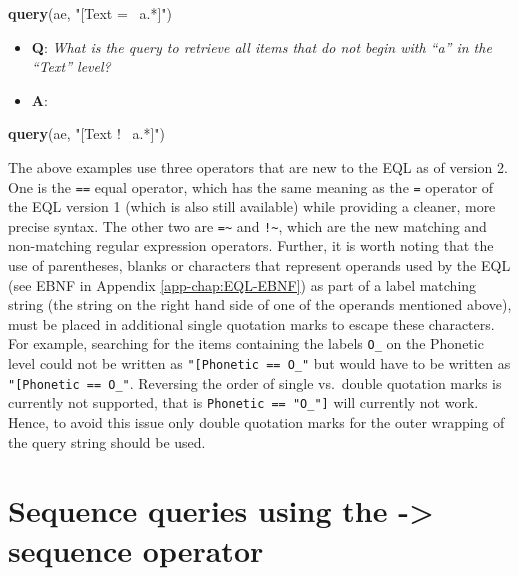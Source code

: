 \documentclass[]{book}
\newenvironment{Shaded}{\begin{snugshade}}{\end{snugshade}}
\newcommand{\KeywordTok}[1]{\textcolor[rgb]{0.13,0.29,0.53}{\textbf{#1}}}
\newcommand{\NormalTok}[1]{#1}
\newcommand{\StringTok}[1]{\textcolor[rgb]{0.31,0.60,0.02}{#1}}
\providecommand{\tightlist}{%
  \setlength{\itemsep}{0pt}\setlength{\parskip}{0pt}}
\begin{document}
\begin{Shaded}
\begin{Highlighting}[]
\KeywordTok{query}\NormalTok{(ae, }\StringTok{"[Text =~ a.*]"}\NormalTok{)}
\end{Highlighting}
\end{Shaded}

\begin{itemize}
\tightlist
\item
  \textbf{Q}: \emph{What is the query to retrieve all items that do not begin with ``a'' in the ``Text'' level?}
\item
  \textbf{A}:
\end{itemize}

\begin{Shaded}
\begin{Highlighting}[]
\KeywordTok{query}\NormalTok{(ae, }\StringTok{"[Text !~ a.*]"}\NormalTok{)}
\end{Highlighting}
\end{Shaded}

The above examples use three operators that are new to the EQL as of version 2. One is the \texttt{==} equal operator, which has the same meaning as the \texttt{=} operator of the EQL version 1 (which is also still available) while providing a cleaner, more precise syntax. The other two are \texttt{=\textasciitilde{}} and \texttt{!\textasciitilde{}}, which are the new matching and non-matching regular expression operators. Further, it is worth noting that the use of parentheses, blanks or characters that represent operands used by the EQL (see EBNF in Appendix \ref{app-chap:EQL-EBNF}) as part of a label matching string (the string on the right hand side of one of the operands mentioned above), must be placed in additional single quotation marks to escape these characters. For example, searching for the items containing the labels \texttt{O\_\textquotesingle{}} on the Phonetic level could not be written as \texttt{"{[}Phonetic\ ==\ O\_\textquotesingle{}{]}"} but would have to be written as \texttt{"{[}Phonetic\ ==\ \textquotesingle{}O\_\textquotesingle{}\textquotesingle{}{]}"}. Reversing the order of single vs.~double quotation marks is currently not supported, that is \texttt{\textquotesingle{}{[}Phonetic\ ==\ "O\_\textquotesingle{}"{]}\textquotesingle{}} will currently not work. Hence, to avoid this issue only double quotation marks for the outer wrapping of the query string should be used.

\hypertarget{sequence-queries-using-the---sequence-operator}{%
\section{Sequence queries using the -\textgreater{} sequence operator}\label{sequence-queries-using-the---sequence-operator}}
\end{document}
